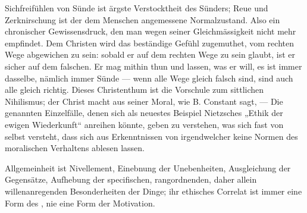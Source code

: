 Sichfreifühlen von Sünde ist ärgste Verstocktheit des Sünders; Reue und Zerknirschung ist der dem Menschen angemessene Normalzustand. Also ein chronischer Gewissensdruck, den man wegen seiner Gleichmässigkeit nicht mehr empfindet. Dem Christen wird das beständige Gefühl zugemuthet, vom rechten Wege abgewichen zu sein: sobald er auf dem rechten Wege zu sein glaubt, ist er sicher auf dem falschen. Er mag mithin thun und lassen, was er will, es ist immer dasselbe, nämlich immer Sünde — wenn alle Wege gleich falsch sind, sind auch alle gleich richtig. Dieses Christenthum ist die Vorschule zum sittlichen Nihilismus; der Christ macht aus seiner Moral, wie B. Constant sagt,  — Die genannten Einzelfälle, denen sich als neuestes Beispiel Nietzsches „Ethik der ewigen Wiederkunft“ anreihen könnte, geben zu verstehen, was sich fast von selbst versteht, dass sich aus Erkenntnissen von irgendwelcher  keine Normen des moralischen Verhaltens ablesen lassen.
\par

Allgemeinheit ist Nivellement, Einebnung der Unebenheiten, Ausgleichung der Gegensätze, Aufhebung der specifischen, rangordnenden, daher allein willenanregenden Besonderheiten der Dinge; ihr ethisches Correlat ist immer eine Form des , nie eine Form der Motivation.
\par


